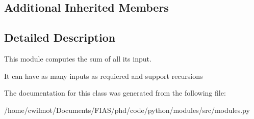 \subsection*{Additional Inherited Members}


\subsection{Detailed Description}
This module computes the sum of all its input. 

It can have as many inputs as requiered and support recursions 

The documentation for this class was generated from the following file\+:\begin{DoxyCompactItemize}
\item 
/home/cwilmot/\+Documents/\+F\+I\+A\+S/phd/code/python/modules/src/modules.\+py\end{DoxyCompactItemize}
